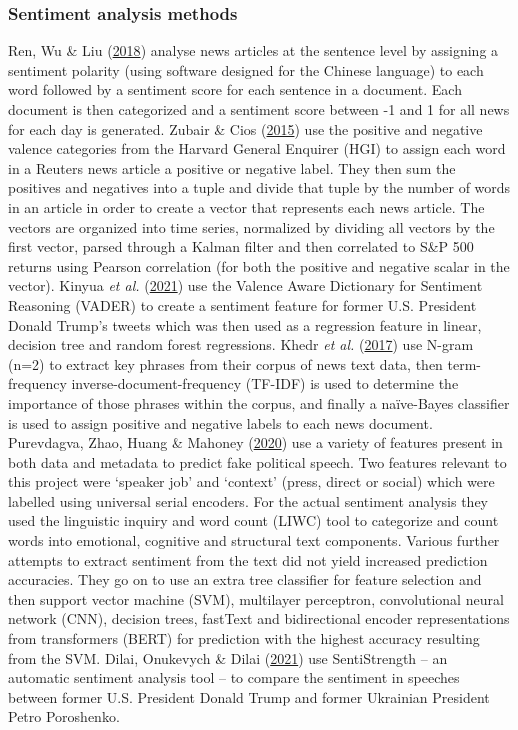 \documentclass[11pt,preprint, authoryear]{elsarticle}
\numberwithin{equation}{section}
\numberwithin{figure}{section}
\numberwithin{table}{section}
\begin{document}
\hypertarget{sentiment-analysis-methods}{%
\subsubsection{\texorpdfstring{Sentiment analysis methods
\label{sentAnal}}{Sentiment analysis methods }}\label{sentiment-analysis-methods}}

Ren, Wu \& Liu (\protect\hyperlink{ref-ren2018forecasting}{2018})
analyse news articles at the sentence level by assigning a sentiment
polarity (using software designed for the Chinese language) to each word
followed by a sentiment score for each sentence in a document. Each
document is then categorized and a sentiment score between -1 and 1 for
all news for each day is generated. Zubair \& Cios
(\protect\hyperlink{ref-zubair2015extracting}{2015}) use the positive
and negative valence categories from the Harvard General Enquirer (HGI)
to assign each word in a Reuters news article a positive or negative
label. They then sum the positives and negatives into a tuple and divide
that tuple by the number of words in an article in order to create a
vector that represents each news article. The vectors are organized into
time series, normalized by dividing all vectors by the first vector,
parsed through a Kalman filter and then correlated to S\&P 500 returns
using Pearson correlation (for both the positive and negative scalar in
the vector). Kinyua \emph{et al.}
(\protect\hyperlink{ref-kinyua2021analysis}{2021}) use the Valence Aware
Dictionary for Sentiment Reasoning (VADER) to create a sentiment feature
for former U.S. President Donald Trump's tweets which was then used as a
regression feature in linear, decision tree and random forest
regressions. Khedr \emph{et al.}
(\protect\hyperlink{ref-khedr2017predicting}{2017}) use N-gram (n=2) to
extract key phrases from their corpus of news text data, then
term-frequency inverse-document-frequency (TF-IDF) is used to determine
the importance of those phrases within the corpus, and finally a
naïve-Bayes classifier is used to assign positive and negative labels to
each news document. Purevdagva, Zhao, Huang \& Mahoney
(\protect\hyperlink{ref-purevdagva2020machine}{2020}) use a variety of
features present in both data and metadata to predict fake political
speech. Two features relevant to this project were `speaker job' and
`context' (press, direct or social) which were labelled using universal
serial encoders. For the actual sentiment analysis they used the
linguistic inquiry and word count (LIWC) tool to categorize and count
words into emotional, cognitive and structural text components. Various
further attempts to extract sentiment from the text did not yield
increased prediction accuracies. They go on to use an extra tree
classifier for feature selection and then support vector machine (SVM),
multilayer perceptron, convolutional neural network (CNN), decision
trees, fastText and bidirectional encoder representations from
transformers (BERT) for prediction with the highest accuracy resulting
from the SVM. Dilai, Onukevych \& Dilai
(\protect\hyperlink{ref-dilaisentiment}{2021}) use SentiStrength -- an
automatic sentiment analysis tool -- to compare the sentiment in
speeches between former U.S. President Donald Trump and former Ukrainian
President Petro Poroshenko.
\end{document}
